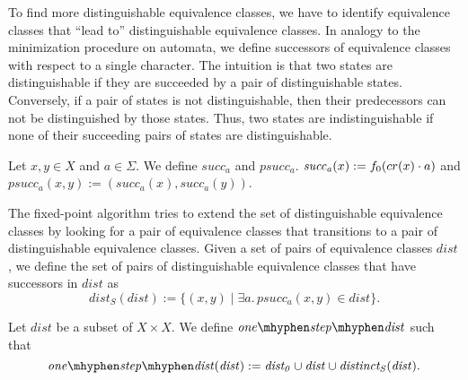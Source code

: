 

To find more distinguishable equivalence classes, we have to identify equivalence classes that ``lead to'' distinguishable equivalence classes. 
In analogy to the minimization procedure on automata, we define successors of equivalence classes with respect to a single character.
The intuition is that two states are distinguishable if they are succeeded by a pair of distinguishable states.
Conversely, if a pair of states is not distinguishable, then their predecessors can not be distinguished by those states.
Thus, two states are indistinguishable if none of their succeeding pairs of states are distinguishable.


\begin{definition}
    Let $x,y \in X$ and $a \in \Sigma$.
    We define $\mathit{succ_a}$ and $\mathit{psucc_a}$. $\mathit{succ_a}(x) := {f_0}(cr(x)\cdot a)$ and $\mathit{psucc_a}(x,y) := (\mathit{succ_a}(x), \mathit{succ_a}(y))$.
\end{definition}

The fixed-point algorithm tries to extend the set of distinguishable equivalence classes by looking for a pair of equivalence classes that transitions to a pair of distinguishable equivalence classes. 
Given a set of pairs of equivalence classes $\mathit{dist}$, 
we define the set of pairs of distinguishable equivalence classes that have successors in $\mathit{dist}$ as
\begin{equation*}
    \mathit{dist_S}(\mathit{dist}) := \{ (x,y) \; | \; \exists a. \, \mathit{psucc_a}(x,y) \in \mathit{dist}\}.
\end{equation*}

\begin{definition}
    \label{one_step_dist}
    Let $\mathit{dist}$ be a subset of $X \times X$. We define $\mathit{one\mhyphen step\mhyphen dist}$ such that
    \begin{equation*}
        \mathit{one\mhyphen step\mhyphen dist}(\mathit{dist}) := \mathit{dist_0} \cup \mathit{dist} \cup \mathit{distinct_S}(\mathit{dist}).
    \end{equation*}
\end{definition}


